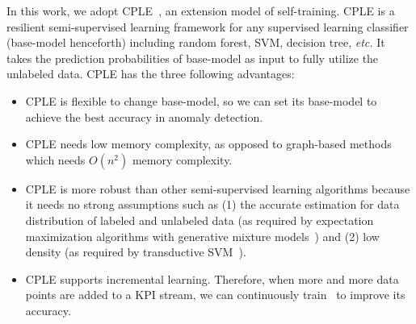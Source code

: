 In this work, we adopt CPLE~\cite{loog2016contrastive}, an extension model of self-training.
CPLE is a resilient semi-supervised learning framework for any supervised learning classifier (base-model henceforth) including random forest, SVM, decision tree, \emph{etc.} 
It takes the prediction probabilities of base-model as input to fully utilize the unlabeled data.
CPLE has the three following advantages: 
\begin{itemize}
  \item  
  CPLE is flexible to change base-model, so we can set its base-model to achieve the best accuracy in anomaly detection. 
  \item CPLE needs low memory complexity, as opposed to graph-based methods~\cite{camps2007semi} which needs $O(n^2)$ memory complexity.
  \item CPLE is more robust than other semi-supervised learning algorithms because it needs no strong assumptions such as (1) the accurate estimation for data distribution of labeled and unlabeled data (as required by  expectation maximization algorithms with generative mixture models~\cite{nigam2000text}) and (2) low density (as required by transductive SVM~\cite{joachims1999transductive}).
  \item CPLE supports incremental learning. 
  Therefore, when more and more data points are added to a KPI stream, we can continuously train \name~to improve its accuracy.
\end{itemize}





